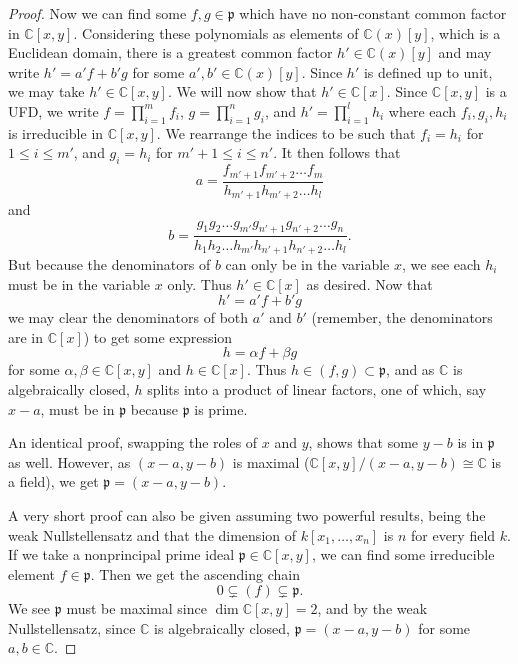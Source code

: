 \documentclass{article}
\newcommand{\C}{\mathbb{C}}
\newcommand{\frkp}{\mathfrak{p}}
\begin{document}
\begin{proof}
    Now we can find some $f,g\in \frkp$ which have no non-constant common factor in $\C[x,y]$. Considering these polynomials as elements of $\C(x)[y]$, which is a Euclidean domain, there is a greatest common factor $h'\in \C(x)[y]$ and may write $h' = a' f+b'g$ for some $a',b'\in \C(x)[y]$. Since $h'$ is defined up to unit, we may take $h'\in \C[x,y]$. We will now show that $h'\in \C[x]$. Since $\C[x,y]$ is a UFD, we write $f=\prod_{i=1}^m f_i$, $g=\prod_{i=1}^n g_i$, and $h'=\prod_{i=1}^l h_i$ where each $f_i, g_i, h_i$ is irreducible in $\C[x,y]$. We rearrange the indices to be such that $f_i= h_i$ for $1\le i \le m'$, and $g_i = h_i$ for $m'+1\le i \le n'$. It then follows that
    \[
    a= \frac{f_{m'+1}f_{m'+2}\dots f_{m}}{h_{m'+1}h_{m'+2}\dots h_l}
    \]
    and 
    \[
    b= \frac{g_1 g_2 \dots g_{m'} g_{n'+1} g_{n'+2} \dots g_n}{h_1 h_2 \dots h_{m'} h_{n'+1} h_{n'+2} \dots h_l}.
    \]
    But because the denominators of $b$ can only be in the variable $x$, we see each $h_i$ must be in the variable $x$ only. Thus $h'\in \C[x]$ as desired. Now that
    \[
    h'=a'f+b'g
    \]
    we may clear the denominators of both $a'$ and $b'$ (remember, the denominators are in $\C[x]$) to get some expression
    \[
    h=\alpha f +\beta g
    \]
    for some $\alpha, \beta \in \C[x,y]$ and $h\in \C[x]$. Thus $h \in (f,g)\subset \frkp$, and as $\C$ is algebraically closed, $h$ splits into a product of linear factors, one of which, say $x-a$, must be in $\frkp$ because $\frkp$ is prime.

    An identical proof, swapping the roles of $x$ and $y$, shows that some $y-b$ is in $\frkp$ as well. However, as $(x-a,y-b)$ is maximal ($\C[x,y]/(x-a,y-b) \cong \C$ is a field), we get $\frkp = (x-a,y-b)$.
    \vspace{0.1in}

    A very short proof can also be given assuming two powerful results, being the weak Nullstellensatz and that the dimension of $k[x_1,\dots,x_n]$ is $n$ for every field $k$. If we take a nonprincipal prime ideal $\frkp\in \C[x,y]$, we can find some irreducible element $f\in \frkp$. Then we get the ascending chain
    \[
    0\subsetneq (f) \subsetneq \frkp.
    \]
    We see $\frkp$ must be maximal since $\dim \C[x,y]=2$, and by the weak Nullstellensatz, since $\C$ is algebraically closed, $\frkp=(x-a,y-b)$ for some $a,b\in \C$.
\end{proof}
\end{document}

